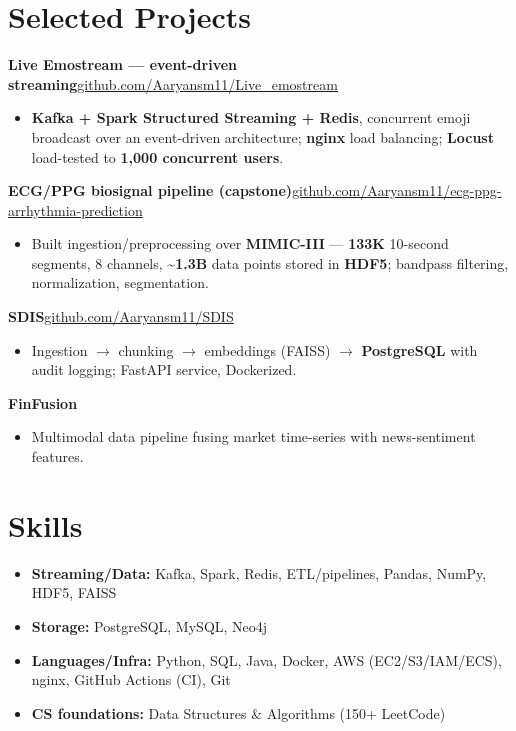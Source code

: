 \documentclass[10pt,a4paper]{article}
\begin{document}
\section*{Selected Projects}
\vspace{1pt}\textbf{Live Emostream --- event-driven streaming}\hfill {\small\href{https://github.com/Aaryansm11/Live_emostream}{github.com/Aaryansm11/Live\_emostream}}
\begin{itemize}
\item \textbf{Kafka + Spark Structured Streaming + Redis}, concurrent emoji broadcast over an event-driven architecture; \textbf{nginx} load balancing; \textbf{Locust} load-tested to \textbf{1,000 concurrent users}.
\end{itemize}
\vspace{1pt}\textbf{ECG/PPG biosignal pipeline (capstone)}\hfill {\small\href{https://github.com/Aaryansm11/ecg-ppg-arrhythmia-prediction}{github.com/Aaryansm11/ecg-ppg-arrhythmia-prediction}}
\begin{itemize}
\item Built ingestion/preprocessing over \textbf{MIMIC-III} --- \textbf{133K} 10-second segments, 8 channels, \textasciitilde{}\textbf{1.3B} data points stored in \textbf{HDF5}; bandpass filtering, normalization, segmentation.
\end{itemize}
\vspace{1pt}\textbf{SDIS}\hfill {\small\href{https://github.com/Aaryansm11/SDIS}{github.com/Aaryansm11/SDIS}}
\begin{itemize}
\item Ingestion $\rightarrow$ chunking $\rightarrow$ embeddings (FAISS) $\rightarrow$ \textbf{PostgreSQL} with audit logging; FastAPI service, Dockerized.
\end{itemize}
\vspace{1pt}\textbf{FinFusion}
\begin{itemize}
\item Multimodal data pipeline fusing market time-series with news-sentiment features.
\end{itemize}
\section*{Skills}
\begin{itemize}
\item \textbf{Streaming/Data:} Kafka, Spark, Redis, ETL/pipelines, Pandas, NumPy, HDF5, FAISS
\item \textbf{Storage:} PostgreSQL, MySQL, Neo4j
\item \textbf{Languages/Infra:} Python, SQL, Java, Docker, AWS (EC2/S3/IAM/ECS), nginx, GitHub Actions (CI), Git
\item \textbf{CS foundations:} Data Structures \& Algorithms (150+ LeetCode)
\end{itemize}
\end{document}
